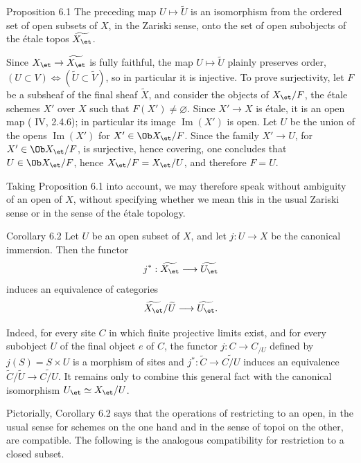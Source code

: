 \begin{statement}{Proposition 6.1}
The preceding map \(U\mapsto \widetilde U\) is an isomorphism from the ordered set of open subsets of \(X\), in the Zariski sense, onto the set of open subobjects of the \'etale topos \(\widetilde{X_{\et}}\).
\end{statement}

Since \(X_{\et}\to\widetilde{X_{\et}}\) is fully faithful, the map \(U\mapsto\widetilde U\) plainly preserves order, \ie \((U\subset V)\Leftrightarrow(\widetilde U\subset\widetilde V)\), so in particular it is injective. To prove surjectivity, let \(F\) be a subsheaf of the final sheaf \(\widetilde X\), and consider the objects of \(X_{\et}/F\), \ie the \'etale schemes \(X'\) over \(X\) such that \(F(X')\ne\varnothing\). Since \(X'\to X\) is \'etale, it is an open map (\EGA{} IV, 2.4.6); in particular its image \(\operatorname{Im}(X')\) is open. Let \(U\) be the union of the opens \(\operatorname{Im}(X')\) for \(X'\in\Ob X_{\et}/F\). Since the family \(X'\to U\), for \(X'\in\Ob X_{\et}/F\), is surjective, hence covering, one concludes that \(U\in\Ob X_{\et}/F\), hence \(X_{\et}/F=X_{\et}/U\), and therefore \(F=U\). \qedtext

Taking Proposition 6.1 into account, we may therefore speak without ambiguity of an open of \(X\), without specifying whether we mean this in the usual Zariski sense or in the sense of the \'etale topology.

\begin{statement}{Corollary 6.2}
Let \(U\) be an open subset of \(X\), and let \(j:U\to X\) be the canonical immersion. Then the functor
\[
j^*:\widetilde{X_{\et}}\longrightarrow \widetilde{U_{\et}}
\]
induces an equivalence of categories
\[
\widetilde{X_{\et}}/\widetilde U\longrightarrow \widetilde{U_{\et}}.
\]
\end{statement}

Indeed, for every site \(C\) in which finite projective limits exist, and for every subobject \(U\) of the final object \(e\) of \(C\), the functor \(j:C\to C_{/U}\) defined by \(j(S)=S\times U\) is a morphism of sites and \(j^*: \widetilde C\to\widetilde{C/U}\) induces an equivalence \(\widetilde C/\widetilde U\to\widetilde{C/U}\). It remains only to combine this general fact with the canonical isomorphism \(U_{\et}\simeq X_{\et}/U\).

Pictorially, Corollary 6.2 says that the operations of restricting to an open, in the usual sense for schemes on the one hand and in the sense of topoi on the other, are compatible. The following is the analogous compatibility for restriction to a closed subset.

